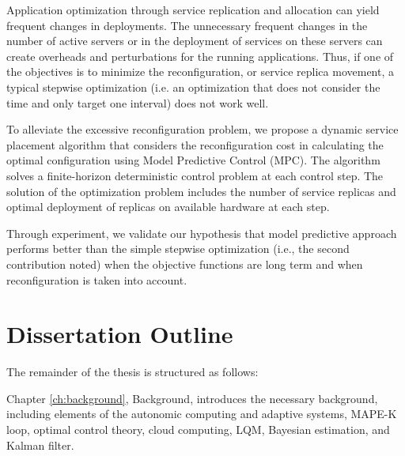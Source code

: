Application optimization through service replication and allocation can yield frequent changes in deployments.
The unnecessary frequent changes in the number of active servers or in the deployment of services on these servers can create overheads and perturbations for the running applications. 
Thus, if one of the objectives is to minimize the reconfiguration, or service replica movement, a typical stepwise optimization (i.e. an optimization that does not consider the time and only target one interval) does not work well. 

    To alleviate the excessive reconfiguration problem, we propose a dynamic service placement algorithm that considers the reconfiguration cost in calculating the optimal configuration using Model Predictive Control (MPC). The algorithm solves a finite-horizon deterministic control problem at each control step. The solution of the optimization problem includes the number of service replicas and optimal deployment of replicas on available hardware at each step. 

   Through experiment, we validate our hypothesis that model predictive approach performs better than the simple stepwise optimization (i.e., the second contribution noted) when the objective functions are long term and when reconfiguration is taken into account.

  \section{Dissertation Outline}
 The remainder of the thesis is structured as follows:  

  Chapter \ref{ch:background}, Background, introduces the necessary background, including elements of the autonomic computing and adaptive systems, MAPE-K loop, optimal control theory, cloud computing, LQM, Bayesian estimation, and Kalman filter. 
	
